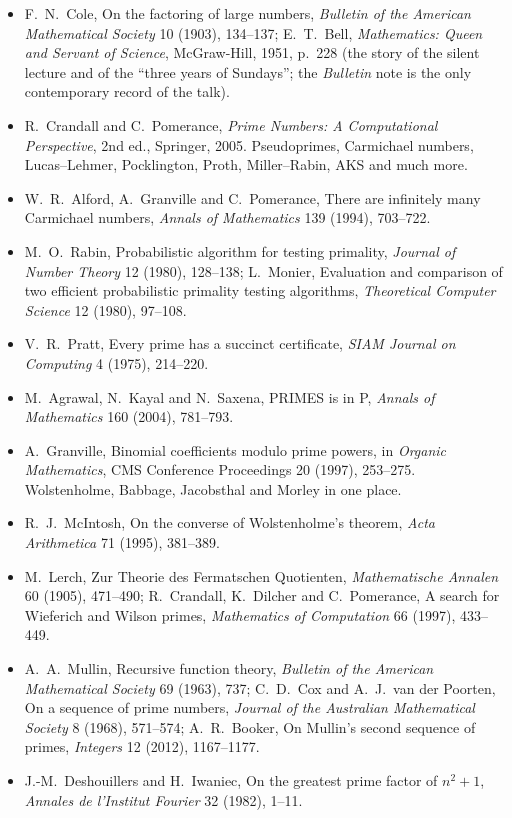\begin{itemize}
\item F.~N.~Cole, On the factoring of large numbers, \emph{Bulletin of the American Mathematical Society} 10 (1903), 134--137; E.~T.~Bell,
\emph{Mathematics: Queen and Servant of Science}, McGraw-Hill, 1951, p.~228 (the story of the silent lecture and of
the ``three years of Sundays''; the \emph{Bulletin} note is the only contemporary record of the talk).
\item R.~Crandall and C.~Pomerance, \emph{Prime Numbers: A Computational Perspective}, 2nd ed., Springer, 2005. Pseudoprimes,
Carmichael numbers, Lucas--Lehmer, Pocklington, Proth, Miller--Rabin, AKS and much more.
\item W.~R.~Alford, A.~Granville and C.~Pomerance, There are infinitely many Carmichael numbers, \emph{Annals of Mathematics} 139 (1994),
703--722.
\item M.~O.~Rabin, Probabilistic algorithm for testing primality, \emph{Journal of Number Theory} 12 (1980), 128--138; L.~Monier,
Evaluation and comparison of two efficient probabilistic primality testing algorithms, \emph{Theoretical Computer Science} 12 (1980),
97--108.
\item V.~R.~Pratt, Every prime has a succinct certificate, \emph{SIAM Journal on Computing} 4 (1975), 214--220.
\item M.~Agrawal, N.~Kayal and N.~Saxena, PRIMES is in P, \emph{Annals of Mathematics} 160 (2004), 781--793.
\item A.~Granville, Binomial coefficients modulo prime powers, in \emph{Organic Mathematics}, CMS Conference Proceedings 20 (1997), 253--275.
Wolstenholme, Babbage, Jacobsthal and Morley in one place.
\item R.~J.~McIntosh, On the converse of Wolstenholme's theorem, \emph{Acta Arithmetica} 71 (1995), 381--389.
\item M.~Lerch, Zur Theorie des Fermatschen Quotienten, \emph{Mathematische Annalen} 60 (1905), 471--490; R.~Crandall, K.~Dilcher and
C.~Pomerance, A search for Wieferich and Wilson primes, \emph{Mathematics of Computation} 66 (1997), 433--449.
\item A.~A.~Mullin, Recursive function theory, \emph{Bulletin of the American Mathematical Society} 69 (1963), 737; C.~D.~Cox and
A.~J.~van der Poorten, On a sequence of prime numbers, \emph{Journal of the Australian Mathematical Society} 8 (1968), 571--574;
A.~R.~Booker, On Mullin's second sequence of primes, \emph{Integers} 12 (2012), 1167--1177.
\item J.-M.~Deshouillers and H.~Iwaniec, On the greatest prime factor of $n^2+1$, \emph{Annales de l'Institut Fourier} 32 (1982), 1--11.

\end{itemize}
